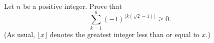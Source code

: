 Let $n$ be a positive integer. Prove that
$$\sum_{k=1}^n (-1)^{\lfloor k (\sqrt{2} - 1) \rfloor} \geq 0.$$(As usual, $\lfloor x \rfloor$ denotes the greatest integer less than or equal to $x$.)